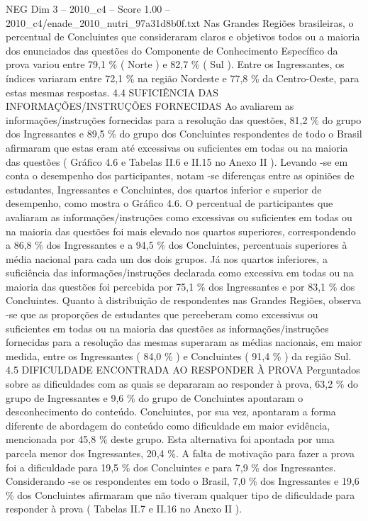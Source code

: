 \begin{textsample}{NEG Dim 3 – 2010\_c4 – Score 1.00 – 2010\_c4/enade\_2010\_nutri\_97a31d8b0f.txt}
Nas Grandes Regiões brasileiras, o percentual de Concluintes que consideraram claros e objetivos todos ou a maioria dos enunciados das questões do Componente de Conhecimento Específico da prova variou entre 79,1 \% ( Norte ) e 82,7 \% ( Sul ).
Entre os Ingressantes, os índices variaram entre 72,1 \% na região Nordeste e 77,8 \% da Centro-Oeste, para estas mesmas respostas. 4.4 SUFICIÊNCIA DAS INFORMAÇÕES/INSTRUÇÕES FORNECIDAS Ao avaliarem as informações/instruções fornecidas para a resolução das questões, 81,2 \% do grupo dos Ingressantes e 89,5 \% do grupo dos Concluintes respondentes de todo o Brasil afirmaram que estas eram até excessivas ou suficientes em todas ou na maioria das questões ( Gráfico 4.6 e Tabelas II.6 e II.15 no Anexo II ).
Levando -se em conta o desempenho dos participantes, notam -se diferenças entre as opiniões de estudantes, Ingressantes e Concluintes, dos quartos inferior e superior de desempenho, como mostra o Gráfico 4.6.
O percentual de participantes que avaliaram as informações/instruções como excessivas ou suficientes em todas ou na maioria das questões foi mais elevado nos quartos superiores, correspondendo a 86,8 \% dos Ingressantes e a 94,5 \% dos Concluintes, percentuais superiores à média nacional para cada um dos dois grupos.
Já nos quartos inferiores, a suficiência das informações/instruções declarada como excessiva em todas ou na maioria das questões foi percebida por 75,1 \% dos Ingressantes e por 83,1 \% dos Concluintes.
Quanto à distribuição de respondentes nas Grandes Regiões, observa -se que as proporções de estudantes que perceberam como excessivas ou suficientes em todas ou na maioria das questões as informações/instruções fornecidas para a resolução das mesmas superaram as médias nacionais, em maior medida, entre os Ingressantes ( 84,0 \% ) e Concluintes ( 91,4 \% ) da região Sul. 4.5 DIFICULDADE ENCONTRADA AO RESPONDER À PROVA Perguntados sobre as dificuldades com as quais se depararam ao responder à prova, 63,2 \% do grupo de Ingressantes e 9,6 \% do grupo de Concluintes apontaram o desconhecimento do conteúdo.
Concluintes, por sua vez, apontaram a forma diferente de abordagem do conteúdo como dificuldade em maior evidência, mencionada por 45,8 \% deste grupo.
Esta alternativa foi apontada por uma parcela menor dos Ingressantes, 20,4 \%.
A falta de motivação para fazer a prova foi a dificuldade para 19,5 \% dos Concluintes e para 7,9 \% dos Ingressantes.
Considerando -se os respondentes em todo o Brasil, 7,0 \% dos Ingressantes e 19,6 \% dos Concluintes afirmaram que não tiveram qualquer tipo de dificuldade para responder à prova ( Tabelas II.7 e II.16 no Anexo II ).

\end{textsample}
